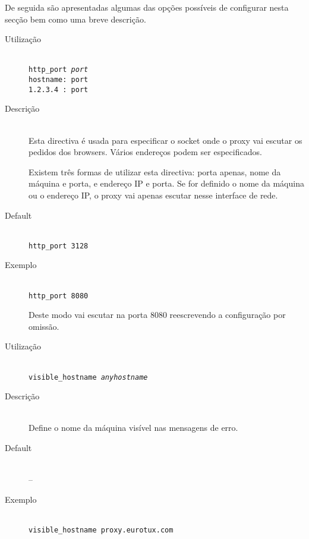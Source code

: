 De seguida são apresentadas algumas das opções possíveis de
configurar nesta secção bem como uma breve descrição.



\begin{description}
\item[Utilização]~\\
\texttt{http\_port \emph{port}\\
hostname: port\\
1.2.3.4 : port}

\item[Descrição]~\\
Esta directiva é usada para especificar o socket onde o proxy vai
escutar os pedidos dos browsers. Vários endereços podem ser
especificados.

Existem três formas de utilizar esta directiva: porta apenas, nome
da máquina e porta, e endereço IP e porta.
Se for definido o nome da máquina ou o endereço IP, o proxy vai
apenas escutar nesse interface de rede.

\item[Default]~\\
\texttt{http\_port 3128}

\item[Exemplo]~\\
\texttt{http\_port 8080}

Deste modo vai escutar na porta 8080 reescrevendo a configuração
por omissão.
\end{description}


\begin{description}
\item[Utilização]~\\
\texttt{visible\_hostname \emph{anyhostname}}

\item[Descrição]~\\
Define o nome da máquina visível nas mensagens de erro.

\item[Default]~\\
--

\item[Exemplo]~\\
\texttt{visible\_hostname proxy.eurotux.com}
\end{description}


